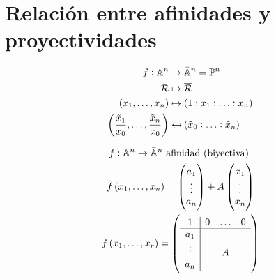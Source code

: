 \section{Relación entre afinidades y proyectividades}
\begin{minipage}[c]{0,49\textwidth}
    \begin{align*}
            f : \mathbb{A}^n &\to \bar{\mathbb{A}}^n=\mathbb{P}^n \\
            \mathcal{R} &\mapsto \overline{\mathcal{R}} \\
            \left( x_1, \ldots, x_n\right) &\mapsto \left(1:x_1:\ldots:x_n\right)\\
            \left(\frac{\tilde{x}_1}{x_0},\ldots,\frac{\tilde{x}_n}{x_0}\right) &\mapsfrom \left(\tilde{x}_0:\ldots:\tilde{x}_n\right) \\
    \end{align*}
\end{minipage}
\vline
\begin{minipage}[c]{0,49\textwidth}
    \begin{gather*}
        f : \mathbb{A}^n \to \bar{\mathbb{A}}^n  \text{  afinidad (biyectiva) }\\
        f\left( x_1,\ldots,x_n\right) = 
        \begin{pmatrix}
            a_1 \\
            \vdots \\
            a_n \\
        \end{pmatrix}
        +A
        \begin{pmatrix}
            x_1 \\
            \vdots \\
            x_n \\
        \end{pmatrix}\\
        f\left( x_1,\ldots,x_r\right) =
        \left(
        \begin{array}{c|ccc}
            1 & 0 & \ldots & 0 \\ \hline
            a_1 & & & \\
            \vdots & & A & \\
            a_n & & & 
        \end{array} \right)
    \end{gather*}
\end{minipage}
